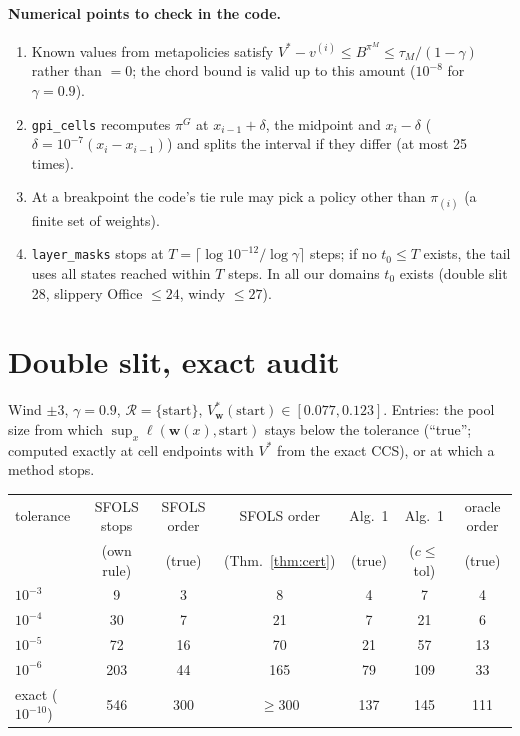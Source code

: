 \documentclass[11pt]{article}
\newcommand{\w}{\mathbf{w}}
\newcommand{\cR}{\mathcal R}
\theoremstyle{definition}
\begin{document}
\paragraph{Numerical points to check in the code.}
\begin{enumerate}
\item Known values from metapolicies satisfy $V^*-v^{(i)}\le B^{\pi^M}\le\tau_M/(1-\gamma)$ rather than $=0$; the
chord bound is valid up to this amount ($10^{-8}$ for $\gamma=0.9$).
\item \texttt{gpi\_cells} recomputes $\pi^G$ at $x_{i-1}+\delta$, the midpoint and $x_i-\delta$
($\delta=10^{-7}(x_i-x_{i-1})$) and splits the interval if they differ (at most 25 times).
\item At a breakpoint the code's tie rule may pick a policy other than $\pi_{(i)}$ (a finite set of weights).
\item \texttt{layer\_masks} stops at $T=\lceil\log10^{-12}/\log\gamma\rceil$ steps; if no $t_0\le T$ exists, the tail uses all
states reached within $T$ steps. In all our domains $t_0$ exists (double slit 28, slippery Office $\le24$,
windy $\le27$).
\end{enumerate}

\section{Double slit, exact audit}

Wind $\pm3$, $\gamma=0.9$, $\cR=\{\text{start}\}$, $V^*_\w(\text{start})\in[0.077,0.123]$. Entries: the pool
size from which $\sup_{x}\ell(\w(x),\text{start})$ stays below the tolerance (``true''; computed exactly at cell
endpoints with $V^*$ from the exact CCS), or at which a method stops.

\begin{center}
\small
\begin{tabular}{@{}lcccccc@{}}
\toprule
tolerance & SFOLS stops & SFOLS order & SFOLS order & Alg.~1 & Alg.~1 & oracle order \\
 & (own rule) & (true) & (Thm.~\ref{thm:cert}) & (true) & ($c\le$ tol) & (true) \\
\midrule
$10^{-3}$ & 9 & 3 & 8 & 4 & 7 & 4 \\
$10^{-4}$ & 30 & 7 & 21 & 7 & 21 & 6 \\
$10^{-5}$ & 72 & 16 & 70 & 21 & 57 & 13 \\
$10^{-6}$ & 203 & 44 & 165 & 79 & 109 & 33 \\
exact ($10^{-10}$) & 546 & 300 & $\ge300$ & 137 & 145 & 111 \\
\bottomrule
\end{tabular}
\end{center}
\end{document}
